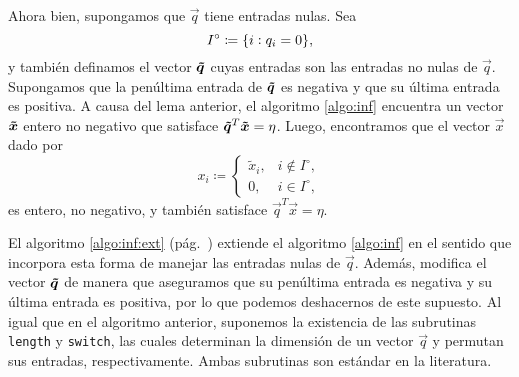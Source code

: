 Ahora bien, supongamos que $\vec{q}$ tiene entradas nulas. Sea
\begin{equation*}
	I^\circ \coloneq \lbrace i \vcentcolon q_i = 0 \rbrace,
\end{equation*}
y también definamos el vector $\boldsymbol{\tilde{q}}$ cuyas entradas son las entradas no nulas de $\vec{q}$.
Supongamos que la penúltima entrada de $\boldsymbol{\tilde{q}}$ es negativa y que su última entrada es positiva. A
causa del lema anterior, el algoritmo \ref{algo:inf} encuentra un vector $\boldsymbol{\tilde{x}}$ entero no
negativo que satisface $\boldsymbol{\tilde{q}}^T\boldsymbol{\tilde{x}} = \eta$. Luego, encontramos que el vector $\vec{x}$ dado
por
\begin{equation*}
	x_i \coloneq
	\begin{cases}
		\tilde{x}_i, & i \not \in I^\circ, \\
		0, & i \in I^\circ,
	\end{cases}
\end{equation*}
es entero, no negativo, y también satisface $\vec{q}^T\vec{x} = \eta$.

El algoritmo \ref{algo:inf:ext} (pág.~\pageref{algo:inf:ext}) extiende el algoritmo \ref{algo:inf} en
el sentido que incorpora esta forma de manejar las entradas nulas de $\vec{q}$. Además, modifica el
vector $\boldsymbol{\tilde{q}}$ de manera que aseguramos que su penúltima entrada es negativa y su última entrada
es positiva, por lo que podemos deshacernos de este supuesto. Al igual que en el algoritmo anterior,
suponemos la existencia de las subrutinas \texttt{length} y \texttt{switch}, las cuales determinan
la dimensión de un vector $\vec{q}$ y permutan sus entradas, respectivamente. Ambas subrutinas son
estándar en la literatura.

